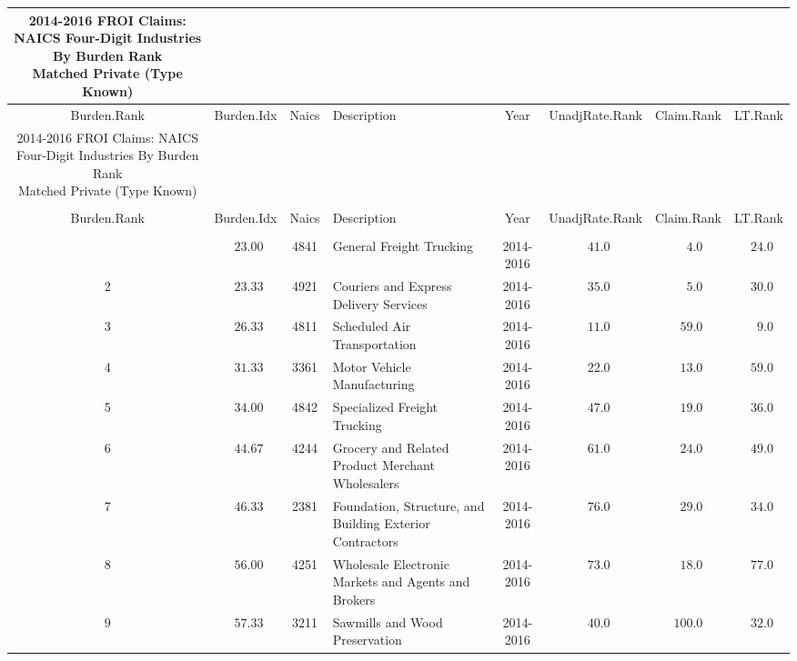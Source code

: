 \documentclass[9pt, oneside]{article}   	%
\begin{document}
\begin{longtable}{cccp{2.0in}cccc}
\caption{2014-2016 FROI Claims: NAICS Four-Digit Industries By Burden Rank\\ Matched Private (Type Known)}\\ 
\toprule
 Burden.Rank & Burden.Idx & Naics & Description & Year & UnadjRate.Rank & Claim.Rank & \multicolumn{1}{c}{LT.Rank} \\ 
   \midrule
   \hline
\endfirsthead
\caption[]{2014-2016 FROI Claims: NAICS Four-Digit Industries By Burden Rank\\ Matched Private (Type Known)}\\ 


\label{Table: 10c_burdenFull}\\
\hline
\toprule
 Burden.Rank & Burden.Idx & Naics & Description & Year & UnadjRate.Rank & Claim.Rank & \multicolumn{1}{c}{LT.Rank} \\ 
   \midrule\\ [-1\normalbaselineskip]\hline\endhead\hline\endfoot
1  & $\phantom{0}23.00$ & 4841 & General Freight Trucking & 2014-2016 & $\phantom{0}41.0$ & $\phantom{00}4.0$ & $\phantom{0}24.0$ \\
2  & $\phantom{0}23.33$ & 4921 & Couriers and Express Delivery Services & 2014-2016 & $\phantom{0}35.0$ & $\phantom{00}5.0$ & $\phantom{0}30.0$ \\
3  & $\phantom{0}26.33$ & 4811 & Scheduled Air Transportation & 2014-2016 & $\phantom{0}11.0$ & $\phantom{0}59.0$ & $\phantom{00}9.0$ \\
4  & $\phantom{0}31.33$ & 3361 & Motor Vehicle Manufacturing & 2014-2016 & $\phantom{0}22.0$ & $\phantom{0}13.0$ & $\phantom{0}59.0$ \\
5  & $\phantom{0}34.00$ & 4842 & Specialized Freight Trucking & 2014-2016 & $\phantom{0}47.0$ & $\phantom{0}19.0$ & $\phantom{0}36.0$ \\
6  & $\phantom{0}44.67$ & 4244 & Grocery and Related Product Merchant Wholesalers & 2014-2016 & $\phantom{0}61.0$ & $\phantom{0}24.0$ & $\phantom{0}49.0$ \\
7  & $\phantom{0}46.33$ & 2381 & Foundation, Structure, and Building Exterior Contractors & 2014-2016 & $\phantom{0}76.0$ & $\phantom{0}29.0$ & $\phantom{0}34.0$ \\
8  & $\phantom{0}56.00$ & 4251 & Wholesale Electronic Markets and Agents and Brokers & 2014-2016 & $\phantom{0}73.0$ & $\phantom{0}18.0$ & $\phantom{0}77.0$ \\
9  & $\phantom{0}57.33$ & 3211 & Sawmills and Wood Preservation & 2014-2016 & $\phantom{0}40.0$ & $100.0$ & $\phantom{0}32.0$ \\

\end{longtable}
\end{document}
